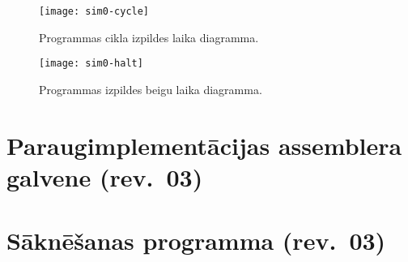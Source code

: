 \begin{sidewaysfigure}
	\centering
	\texttt{[image: sim0-cycle]}\\
	\caption{Programmas cikla izpildes laika diagramma.}
	\label{fig:sim-cycle}
\end{sidewaysfigure}

\begin{sidewaysfigure}
	\centering
	\texttt{[image: sim0-halt]}\\
	\caption{Programmas izpildes beigu laika diagramma.}
	\label{fig:sim-halt}
\end{sidewaysfigure}



\clearpage
\section{Paraugimplementācijas assemblera galvene (rev.~03)}


\clearpage
\section{Sāknēšanas programma (rev.~03)} \label{appx:boot}

